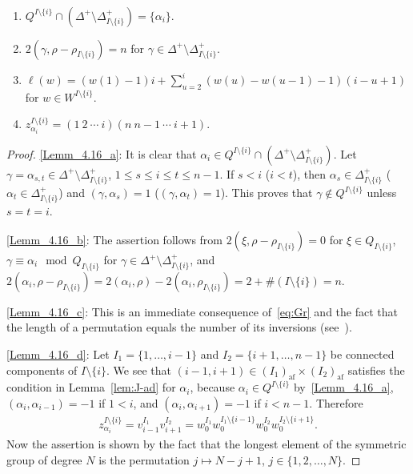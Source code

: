 \documentclass[ALCO,ThmDefs,Unicode,epreuves]{cedram}
\DeclareMathOperator{\af}{af}
\begin{document}
\goodbreak
\begin{lemm} \label{lem:J^i-ad}\ \\[-1.2em]
\begin{enumerate}[label=(\arabic*)]
\item\label{Lemm_4.16_a}
$Q^{I \setminus \{ i \}} \cap (\Delta^+ \setminus \Delta_{I \setminus \{ i \}}^+) = \{ \alpha_i \}$.
\item\label{Lemm_4.16_b}
$2(\gamma,\rho-\rho_{I \setminus \{ i \}}) = n$ 
for 
$\gamma \in \Delta^+ \setminus \Delta_{I \setminus \{ i \}}^+$.
\item\label{Lemm_4.16_c}
$\ell(w) = (w(1) - 1)i + \sum_{u=2}^i (w(u) - w(u-1) -1)(i - u + 1)$ 
for $w \in W^{I \setminus \{ i \}}$.
\item\label{Lemm_4.16_d}
$z_{\alpha_i}^{I \setminus \{ i \}} = (1 \ 2 \ \cdots \ i)(n \ n-1 \ \cdots \ i+1)$.
\end{enumerate}
\end{lemm}

\begin{proof}
\ref{Lemm_4.16_a}: 
It is clear that 
$\alpha_i \in Q^{I \setminus \{ i \}} \cap (\Delta^+ \setminus \Delta_{I \setminus \{ i \}}^+)$. 
Let 
$\gamma = \alpha_{s,t} \in \Delta^+ \setminus \Delta_{I \setminus \{ i \}}^+$, 
$1 \leq s \leq i \leq t \leq n-1$. 
If $s < i$ (\resp $i < t$), then 
$\alpha_s \in \Delta_{I \setminus \{ i \}}^+$
(\resp $\alpha_t \in \Delta_{I \setminus \{ i \}}^+$) 
and 
$(\gamma , \alpha_s) = 1$
(\resp $(\gamma , \alpha_t) = 1$). 
This proves that 
$\gamma \notin Q^{I \setminus \{ i \}}$ 
unless 
$s = t = i$.

\ref{Lemm_4.16_b}: 
The assertion follows from 
$2(\xi , \rho-\rho_{I \setminus \{ i \}}) = 0$
for 
$\xi \in Q_{I \setminus \{ i \}}$, 
$\gamma \equiv \alpha_i \mod Q_{I \setminus \{ i \}}$
for 
$\gamma \in \Delta^+ \setminus \Delta_{I \setminus \{ i \}}^+$, 
and 
$2(\alpha_i , \rho-\rho_{I \setminus \{ i \}}) = 2(\alpha_i , \rho) - 2(\alpha_i , \rho_{I \setminus \{ i \}}) = 2+ \# (I \setminus \{ i \}) = n$.

\ref{Lemm_4.16_c}: 
This is an immediate consequence of~\eqref{eq:Gr} 
and the fact that the length of 
a permutation equals the number of its inversions
(see~\cite[Proposition~1.5.2]{BB}).

\ref{Lemm_4.16_d}: 
Let 
$I_1 = \{ 1 , \ldots , i-1 \}$
and
$I_2 = \{ i+1 , \ldots , n-1 \}$
be connected components of $I \setminus \{ i \}$. 
We see that
$(i-1,i+1) \in (I_1)_{\af} \times (I_2)_{\af}$ 
satisfies the condition in Lemma~\ref{lem:J-ad} for $\alpha_i$, 
because $\alpha_i \in Q^{I \setminus \{ i \}}$ by~\ref{Lemm_4.16_a}, 
$(\alpha_i , \alpha_{i-1}) = -1$ if $1<i$, 
and 
$(\alpha_i , \alpha_{i+1}) = -1$ if $i<n-1$. 
Therefore 
\begin{align}
z_{\alpha_i}^{I \setminus \{ i \}} 
= 
v_{i-1}^{I_1} v_{i+1}^{I_2}
=
w_0^{I_1} w_0^{I_1 \setminus \{ i-1 \}}
w_0^{I_2} w_0^{I_2 \setminus \{ i+1 \}}.
\end{align}
Now the assertion is shown by the fact that 
the longest element of the symmetric group of degree $N$ 
is the permutation 
$j \mapsto N-j+1$, 
$j \in \{ 1,2,\ldots ,N \}$.
\end{proof}
\end{document}

